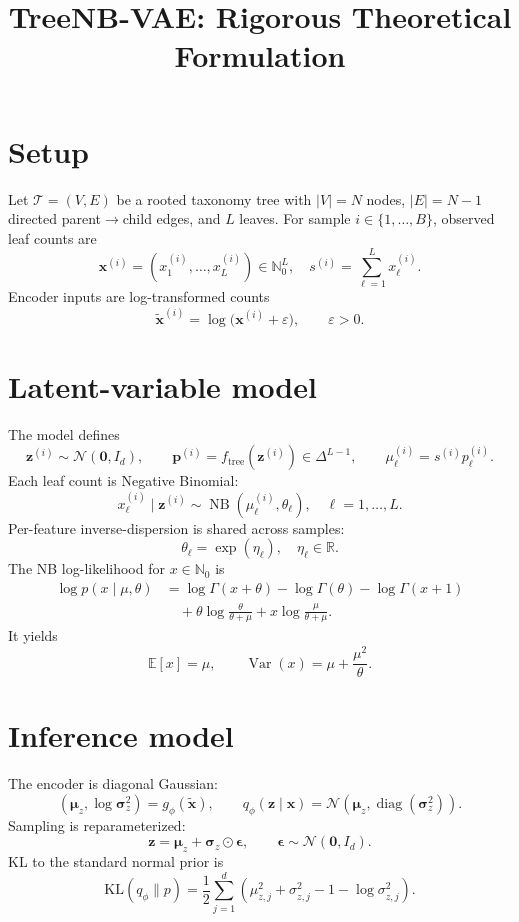 \documentclass[11pt]{article}
\title{TreeNB-VAE: Rigorous Theoretical Formulation}
\date{}
\begin{document}
\maketitle

\section{Setup}
Let $\mathcal{T}=(V,E)$ be a rooted taxonomy tree with $|V|=N$ nodes, $|E|=N-1$ directed parent$\to$child edges, and $L$ leaves.
For sample $i\in\{1,\dots,B\}$, observed leaf counts are
\[
\bm{x}^{(i)}=(x_1^{(i)},\dots,x_L^{(i)})\in\mathbb{N}_0^L,
\quad
s^{(i)}=\sum_{\ell=1}^L x_\ell^{(i)}.
\]
Encoder inputs are log-transformed counts
\[
\tilde{\bm{x}}^{(i)}=\log\big(\bm{x}^{(i)}+\varepsilon\big),\qquad \varepsilon>0.
\]

\section{Latent-variable model}
The model defines
\[
\bm{z}^{(i)}\sim\mathcal{N}(\bm{0},I_d),
\qquad
\bm{p}^{(i)}=f_{\text{tree}}(\bm{z}^{(i)})\in\Delta^{L-1},
\qquad
\mu_\ell^{(i)}=s^{(i)}p_\ell^{(i)}.
\]
Each leaf count is Negative Binomial:
\[
x_\ell^{(i)}\mid\bm{z}^{(i)}\sim\operatorname{NB}(\mu_\ell^{(i)},\theta_\ell),
\quad \ell=1,\dots,L.
\]
Per-feature inverse-dispersion is shared across samples:
\[
\theta_\ell=\exp(\eta_\ell),\quad \eta_\ell\in\mathbb{R}.
\]
The NB log-likelihood for $x\in\mathbb{N}_0$ is
\begin{align*}
\log p(x\mid\mu,\theta)
&=\log\Gamma(x+\theta)-\log\Gamma(\theta)-\log\Gamma(x+1)\\
&\quad+\theta\log\frac{\theta}{\theta+\mu}+x\log\frac{\mu}{\theta+\mu}.
\end{align*}
It yields
\[
\mathbb{E}[x]=\mu,
\qquad
\operatorname{Var}(x)=\mu+\frac{\mu^2}{\theta}.
\]

\section{Inference model}
The encoder is diagonal Gaussian:
\[
(\bm{\mu}_z,\log\bm{\sigma}_z^2)=g_\phi(\tilde{\bm{x}}),
\qquad
q_\phi(\bm{z}\mid\bm{x})=\mathcal{N}(\bm{\mu}_z,\operatorname{diag}(\bm{\sigma}_z^2)).
\]
Sampling is reparameterized:
\[
\bm{z}=\bm{\mu}_z+\bm{\sigma}_z\odot\bm{\epsilon},
\qquad \bm{\epsilon}\sim\mathcal{N}(\bm{0},I_d).
\]
KL to the standard normal prior is
\[
\mathrm{KL}(q_\phi\|p)
=\frac12\sum_{j=1}^d\left(\mu_{z,j}^2+\sigma_{z,j}^2-1-\log\sigma_{z,j}^2\right).
\]
\end{document}
